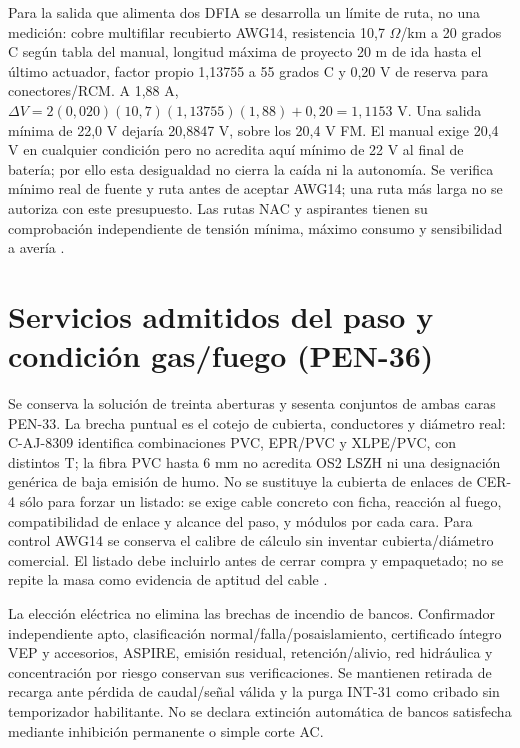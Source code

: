Para la salida que alimenta dos DFIA se desarrolla un límite de ruta, no una medición: cobre multifilar recubierto AWG14, resistencia 10,7 $\Omega$/km a 20 grados C según tabla del manual, longitud máxima de proyecto 20 m de ida hasta el último actuador, factor propio 1,13755 a 55 grados C y 0,20 V de reserva para conectores/RCM. A 1,88 A, $\Delta V=2(0,020)(10,7)(1,13755)(1,88)+0,20=1,1153$ V. Una salida mínima de 22,0 V dejaría 20,8847 V, sobre los 20,4 V FM. El manual exige 20,4 V en cualquier condición pero no acredita aquí mínimo de 22 V al final de batería; por ello esta desigualdad no cierra la caída ni la autonomía. Se verifica mínimo real de fuente y ruta antes de aceptar AWG14; una ruta más larga no se autoriza con este presupuesto. Las rutas NAC y aspirantes tienen su comprobación independiente de tensión mínima, máximo consumo y sensibilidad a avería \parencite[pp.~3-4, 4-3 y ap.~A nota~12]{lote33-cheetah11}.

\section{Servicios admitidos del paso y condición gas/fuego (PEN-36)}
\label{sec:sd4-pen36}
Se conserva la solución de treinta aberturas y sesenta conjuntos de ambas caras PEN-33. La brecha puntual es el cotejo de cubierta, conductores y diámetro real: C-AJ-8309 identifica combinaciones PVC, EPR/PVC y XLPE/PVC, con distintos T; la fibra PVC hasta 6 mm no acredita OS2 LSZH ni una designación genérica de baja emisión de humo. No se sustituye la cubierta de enlaces de CER-4 sólo para forzar un listado: se exige cable concreto con ficha, reacción al fuego, compatibilidad de enlace y alcance del paso, y módulos por cada cara. Para control AWG14 se conserva el calibre de cálculo sin inventar cubierta/diámetro comercial. El listado debe incluirlo antes de cerrar compra y empaquetado; no se repite la masa como evidencia de aptitud del cable \parencite[pp.~3--4]{lote30-caj8309}.

La elección eléctrica no elimina las brechas de incendio de bancos. Confirmador independiente apto, clasificación normal/falla/posaislamiento, certificado íntegro VEP y accesorios, ASPIRE, emisión residual, retención/alivio, red hidráulica y concentración por riesgo conservan sus verificaciones. Se mantienen retirada de recarga ante pérdida de caudal/señal válida y la purga INT-31 como cribado sin temporizador habilitante. No se declara extinción automática de bancos satisfecha mediante inhibición permanente o simple corte AC.

